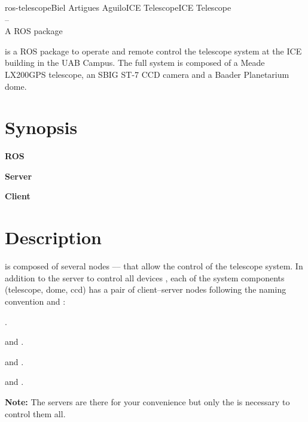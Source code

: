 \documentclass[a4paper,english]{article}
\begin{document}
\begin{Name}{1}{ros-telescope}{Biel Artigues Aguilo}{ICE Telescope}{ICE Telescope\\--\\ A ROS package}

   is a ROS package to operate and remote control the telescope system at the ICE building in the UAB Campus. The full system is composed of a Meade LX200GPS telescope, an SBIG ST-7 CCD camera and a Baader Planetarium dome. 
  \end{Name}

\section{Synopsis}

\textbf{ROS}


\noindent
\textbf{Server}

  

\noindent
\textbf{Client}

     

\section{Description}
 is composed of several nodes ---- that allow the control of the telescope system. In addition to the server to control all devices , each of the system components (telescope, dome, ccd) has a pair of client--server nodes following the naming convention  and : 
\begin{Description}\setlength{\itemsep}{0cm}
\item[\Opt{Full-Server}] .
\item[\Opt{Telescope}]  and .
\item[\Opt{CCD}]  and .
\item[\Opt{Dome}]  and .
\end{Description}

\noindent
\textbf{Note:} The  servers are there for your convenience but only the  is necessary to control them all. \\
\end{document}
